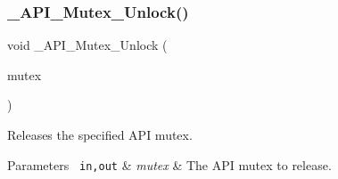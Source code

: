 \subsubsection{\texorpdfstring{\_API\_Mutex\_Unlock()}{\_API\_Mutex\_Unlock()}}
{\footnotesize\ttfamily void \+\_\+\+A\+P\+I\+\_\+\+Mutex\+\_\+\+Unlock (\begin{DoxyParamCaption}\item[{\mbox{\hyperlink{structAPI__Mutex__Control}{A\+P\+I\+\_\+\+Mutex\+\_\+\+Control}} $\ast$}]{mutex }\end{DoxyParamCaption})}



Releases the specified A\+PI mutex. 


\begin{DoxyParams}[1]{Parameters}
\mbox{\texttt{ in,out}}  & {\em mutex} & The A\+PI mutex to release. \\
\hline
\end{DoxyParams}
